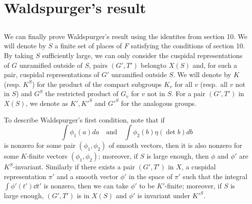 \section{Waldspurger's result}


\subsection{}
We can finally prove Waldspurger's result using the identites from section 10.
We will denote by $S$ a finite set of places of $F$ satisfying the conditions of section 10.
By taking $S$ sufficiently large, we can only consider the cuspidal representations of $G$ unramified outside of $S$, pairs $(G', T')$ belongto $X(S)$ and, for such a pair, cuspidal representations of $G'$ unramified outside $S$.
We will denote by $K$ (resp. $K^S$) for the product of the compact subgroups $K_v$ for all $v$ (resp.\ all $v$ not in $S$) and $G^S$ the restricted product of $G_v$ for $v$ not in $S$.
For a pair $(G', T')$ in $X(S)$, we denote as $K', K'^S$ and $G'^S$ for the analogous groups.

To describe Waldspurger's first condition, note that if
\begin{equation*}
    \int \phi_1(a)da \quad \text{and} \quad \int \phi_2(b)\eta(\det b)db
\end{equation*}
is nonzero for some pair $(\phi_1, \phi_2)$ of smooth vectors, then it is also nonzero for some $K$-finite vectors $(\phi_1, \phi_2)$; moreover, if $S$ is large enough, then $\phi$ and $\phi'$ are $K^S$-invariant.
Similarly if there exists a pair $(G', T')$ in $X$, a cuspidal representation $\pi'$ and a smooth vector $\phi'$ in the space of $\pi'$ such that the integral $\int \phi'(t')\dd t'$ is nonzero, then we can take $\phi'$ to be $K'$-finite; moreover, if $S$ is large enough, $(G', T')$ is in $X(S)$ and $\phi'$ is invariant under $K'^S$.


